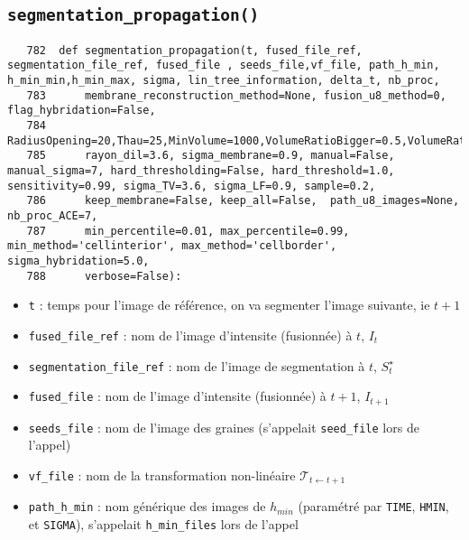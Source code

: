 \documentclass{article}
\def \mycolor {red}
\begin{document}
\subsection{\texttt{segmentation\_propagation()}}
\label{sec:segmentation:propagation}
\begin{verbatim}
   782	def segmentation_propagation(t, fused_file_ref, segmentation_file_ref, fused_file , seeds_file,vf_file, path_h_min, h_min_min,h_min_max, sigma, lin_tree_information, delta_t, nb_proc,
   783	    membrane_reconstruction_method=None, fusion_u8_method=0, flag_hybridation=False, 
   784	    RadiusOpening=20,Thau=25,MinVolume=1000,VolumeRatioBigger=0.5,VolumeRatioSmaller=0.1,MorphosnakeIterations=10,NIterations=200,DeltaVoxels=10**3,Volum_Min_No_Seed=100, 
   785	    rayon_dil=3.6, sigma_membrane=0.9, manual=False, manual_sigma=7, hard_thresholding=False, hard_threshold=1.0, sensitivity=0.99, sigma_TV=3.6, sigma_LF=0.9, sample=0.2, 
   786	    keep_membrane=False, keep_all=False,  path_u8_images=None, nb_proc_ACE=7, 
   787	    min_percentile=0.01, max_percentile=0.99, min_method='cellinterior', max_method='cellborder', sigma_hybridation=5.0, 
   788	    verbose=False):
\end{verbatim} 
\color{\mycolor}
\begin{itemize}
\itemsep -1ex
\item \verb|t| : temps pour l'image de r\'ef\'erence, on va segmenter l'image suivante, ie $t+1$
\item \verb|fused_file_ref| : nom de l'image d'intensite (fusionn\'ee) \`a $t$, $I_t$
\item \verb|segmentation_file_ref| : nom de l'image de segmentation \`a $t$, $S^{\star}_t$
\item \verb|fused_file| : nom de l'image d'intensite (fusionn\'ee) \`a $t+1$, $I_{t+1}$
\item \verb|seeds_file| : nom de l'image des graines (s'appelait \verb|seed_file|  lors de l'appel)
\item \verb|vf_file| : nom de la  transformation non-lin\'eaire $\mathcal{T}_{t \leftarrow t+1}$
\item \verb|path_h_min| : nom g\'en\'erique des images de $h_{min}$ (param\'etr\'e par \verb|TIME|, \verb|HMIN|, et \verb|SIGMA|), s'appelait \verb|h_min_files| lors de l'appel
\end{itemize}
\color{black}
\end{document}

